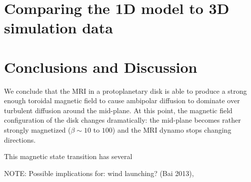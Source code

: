 \section{Comparing the 1D model to 3D simulation data}





\section{Conclusions and Discussion}
We conclude that the MRI in a protoplanetary disk is able to produce a strong enough toroidal magnetic field to cause ambipolar diffusion to dominate over turbulent diffusion around the mid-plane.  At this point, the magnetic field configuration of the disk changes dramatically: the mid-plane becomes rather strongly magnetized ($\beta \sim 10$ to $100$) and the MRI dynamo stops changing directions.

This magnetic state transition has several 

NOTE: Possible implications for: wind launching? (Bai 2013), 







